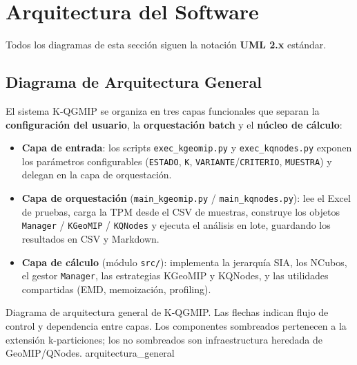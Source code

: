 
\section{Arquitectura del Software}

Todos los diagramas de esta sección siguen la notación \textbf{UML 2.x} estándar.


\subsection{Diagrama de Arquitectura General}

El sistema K-QGMIP se organiza en tres capas funcionales que separan la
\textbf{configuración del usuario}, la \textbf{orquestación batch} y el
\textbf{núcleo de cálculo}:

\begin{itemize}
  \item \textbf{Capa de entrada}: los scripts \texttt{exec\_kgeomip.py} y
        \texttt{exec\_kqnodes.py} exponen los parámetros configurables
        (\texttt{ESTADO}, \texttt{K}, \texttt{VARIANTE}/\texttt{CRITERIO},
        \texttt{MUESTRA}) y delegan en la capa de orquestación.

  \item \textbf{Capa de orquestación} (\texttt{main\_kgeomip.py} /
        \texttt{main\_kqnodes.py}): lee el Excel de pruebas, carga la TPM
        desde el CSV de muestras, construye los objetos \texttt{Manager} /
        \texttt{KGeoMIP} / \texttt{KQNodes} y ejecuta el análisis en lote,
        guardando los resultados en CSV y Markdown.

  \item \textbf{Capa de cálculo} (módulo \texttt{src/}): implementa la
        jerarquía SIA, los NCubos, el gestor \texttt{Manager}, las estrategias
        KGeoMIP y KQNodes, y las utilidades compartidas (EMD, memoización,
        profiling).
\end{itemize}

%
  {Diagrama de arquitectura general de K-QGMIP. Las flechas indican flujo de
   control y dependencia entre capas. Los componentes sombreados pertenecen
   a la extensión k-particiones; los no sombreados son infraestructura
   heredada de GeoMIP/QNodes.}%
  {arquitectura_general}

